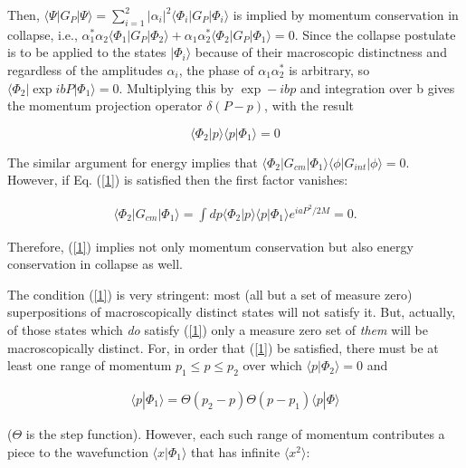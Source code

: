 \documentclass{article}
\begin{document}
	Then, $\langle\Psi |G_{P}|\Psi\rangle=\sum_{i=1}^{2}|\alpha_{i}|^{2}\langle\Phi_{i}|G_{P}|\Phi_{i}\rangle$ 
is implied by momentum conservation in collapse,  
i.e., $\alpha ^{*}_{1}\alpha_{2}\langle\Phi_{1}|G_{P}|\Phi_{2}\rangle+
\alpha_{1}\alpha^{*}_{2}\langle\Phi_{2}|G_{P}|\Phi_{1}\rangle =0$.  Since the collapse 
postulate is to be applied to the states $|\Phi_{i}\rangle$ because of their macroscopic distinctness 
and regardless of the amplitudes $\alpha_{i}$, the phase of 
$\alpha_{1}\alpha ^{*}_{2}$ is arbitrary, so $\langle\Phi_{2}|\exp ibP|\Phi_{1}\rangle=0$.  
Multiplying this by $\exp -ibp$ and integration over b gives the momentum projection operator $\delta(P-p)$, 
with the result 

\begin{equation}\label{1}
 \langle \Phi_{2}|p\rangle\langle p|\Phi_{1}\rangle =0
\end{equation} 

	The similar argument for energy implies that 
$\langle\Phi_{2}|G_{cm}|\Phi_{1}\rangle \langle\phi |G_{int}|\phi \rangle =0$.  However, 
if Eq. (\ref{1}) is satisfied then the first factor vanishes: 

\begin{eqnarray*}
\langle\Phi_{2}|G_{cm}|\Phi_{1}\rangle=\int dp\langle\Phi_{2}|p\rangle\langle p|\Phi_{1}\rangle e^{iaP^{2}/2M}=0.     
\end{eqnarray*}

\noindent Therefore, (\ref{1}) implies not only momentum conservation but 
also energy conservation in collapse as well. 
 
	The condition (\ref{1}) is very stringent: most (all but a set of measure zero) 
superpositions of macroscopically distinct states will not satisfy it. But, actually, 
of those states which {\it do} satisfy (\ref{1}) only a measure zero set of {\it them} will 
be macroscopically distinct. For, in order that (\ref{1}) be satisfied, 
there must be at least one range of momentum 
$p_{1}\leq p\leq p_{2}$ over which $\langle p|\Phi_{2}\rangle=0$ and 


\begin{eqnarray*}
\langle p|\Phi_{1}\rangle = \Theta (p_{2}-p)\Theta (p-p_{1})\langle p|\Phi\rangle    
\end{eqnarray*}

\noindent ($\Theta$ is the step function).  However, each such range of momentum contributes a piece 
to the wavefunction $\langle x|\Phi_{1}\rangle$ that has infinite $\langle x^{2}\rangle$: 
\end{document}

